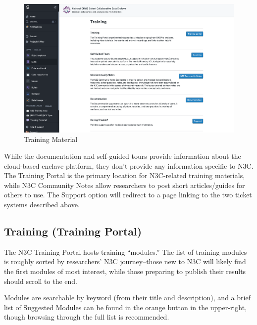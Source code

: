 \documentclass[
  letterpaper,
  DIV=11,
  numbers=noendperiod]{scrreprt}
\begin{document}
\begin{figure}

{\centering \includegraphics{chapters/images/support/image-11-training-material.png}

}

\caption{\label{fig-support-training-material}Training Material}

\end{figure}

While the documentation and self-guided tours provide information about
the cloud-based enclave platform, they don't provide any information
specific to N3C. The Training Portal is the primary location for
N3C-related training materials, while N3C Community Notes allow
researchers to post short articles/guides for others to use. The Support
option will redirect to a page linking to the two ticket systems
described above.

\hypertarget{sec-support-training-portal}{%
\subsection{Training (Training
Portal)}\label{sec-support-training-portal}}

The N3C Training Portal hosts training ``modules.'' The list of training
modules is roughly sorted by researchers' N3C journey--those new to N3C
will likely find the first modules of most interest, while those
preparing to publish their results should scroll to the end.

Modules are searchable by keyword (from their title and description),
and a brief list of Suggested Modules can be found in the orange button
in the upper-right, though browsing through the full list is
recommended.
\end{document}
